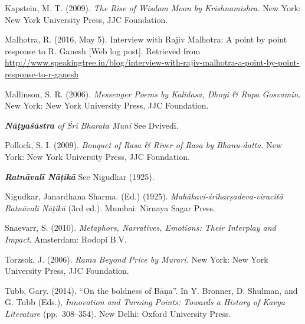 \begin{thebibliography}{99}
Kapstein, M. T. (2009). \textsl{The Rise of Wisdom Moon by Krishnamishra.} New York: New York University Press, JJC Foundation.

Malhotra, R. (2016, May 5). Interview with Rajiv Malhotra: A point by point response to R. Ganesh [Web log post]. Retrieved from   \url{http://www.speakingtree.in/blog/interview-with-rajiv-malhotra-a-point-by-point-response-to-r-ganesh}

Mallinson, S. R. (2006). \textsl{Messenger Poems by Kalidasa, Dhoyi \& Rupa Gosvamin}. New York: New York University Press, JJC Foundation.

\textsl{\textbf{Nāṭyaśāstra} of Śrī Bharata Muni} See Dvivedī.

Pollock, S. I. (2009). \textsl{Bouquet of Rasa \& River of Rasa by Bhanu-datta.} New York: New York University Press, JJC Foundation.

\textsl{\textbf{Ratnāvalī Nāṭikā}} See Nigudkar (1925).

Nigudkar, Janardhana Sharma. (Ed.) (1925). \textsl{Mahākavi-śrīharṣadeva-viracitā Ratnāvalī Nāṭikā} (3rd ed.). Mumbai: Nirnaya Sagar Press.

Snaevarr, S. (2010). \textsl{Metaphors, Narratives, Emotions: Their Interplay and Impact}. Amsterdam: Rodopi B.V.

Torzsok, J. (2006). \textsl{Rama Beyond Price by Murari.} New York: New York University Press, JJC Foundation.

Tubb, Gary. (2014). “On the boldness of Bāṇa”. In Y. Bronner, D. Shulman, and G. Tubb (Eds.), \textsl{Innovation and Turning Points: Towards a History of Kavya Literature} (pp.~308--354). New Delhi: Oxford University Press.
\end{thebibliography}

\theendnotes
\label{chapter\thechapter:end}
